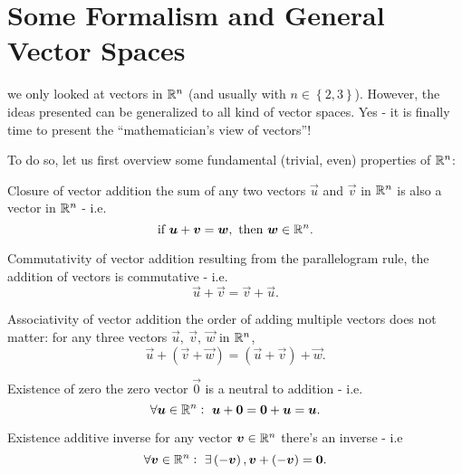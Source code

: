 \section{Some Formalism and General Vector Spaces}
 we only looked at vectors in $\Rs[n]$ (and usually with $n\in\left\{2,3\right\}$). However, the ideas presented can be generalized to all kind of vector spaces. Yes - it is finally time to present the \enquote{mathematician's view of vectors}!

To do so, let us first overview some fundamental (trivial, even) properties of $\Rs[n]$:
\begin{descitemize}
    \item[Closure of vector addition] the sum of any two vectors $\vec{u}$ and $\vec{v}$ in $\Rs[n]$ is also a vector in $\Rs[n]$ - i.e. 
    \begin{equation}
        \text{if}\ \vec{u}+\vec{v}=\vec{w},\ \text{then}\ \vec{w}\in\Rs[n].
        \label{eq:vector_addition_closure}
    \end{equation}
    
    \item[Commutativity of vector addition] resulting from the parallelogram rule, the addition of vectors is commutative - i.e.
    \begin{equation}
        \vec{u}+\vec{v}=\vec{v}+\vec{u}.
        \label{eq:vector_addition_commutative_2}
    \end{equation}

    \item[Associativity of vector addition] the order of adding multiple vectors does not matter: for any three vectors $\vec{u},\ \vec{v},\ \vec{w}$ in $\Rs[n]$,
    \begin{equation}
        \vec{u}+\left(\vec{v}+\vec{w}\right) = \left(\vec{u}+\vec{v}\right)+\vec{w}.
        \label{eq:vector_addition_associative}
    \end{equation}
    
    \item[Existence of zero] the zero vector $\vec{0}$ is a neutral to addition - i.e.
    \begin{equation}
        \forall \vec{u}\in\Rs[n]:\ \vec{u}+\vec{0}=\vec{0}+\vec{u}=\vec{u}.
        \label{eq:vector_zero_existence}
    \end{equation}

    \item[Existence additive inverse] for any vector $\vec{v}\in\Rs[n]$ there's an inverse - i.e
    \begin{equation}
        \forall \vec{v}\in\Rs[n]:\ \exists\left(-\vec{v}\right), \vec{v}+\left(-\vec{v}\right) = \vec{0}.
        \label{eq:vector_zero_addition}
    \end{equation}


\end{descitemize}
